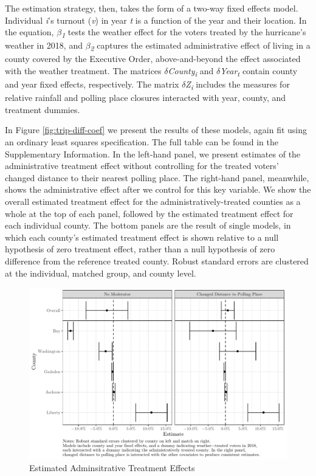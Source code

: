 \documentclass[
  12pt,
]{article}
\begin{document}
The estimation strategy, then, takes the form of a two-way fixed effects model. Individual \emph{i}'s turnout (\emph{v}) in year \emph{t} is a function of the year and their location. In the equation, \emph{\(\beta\)\textsubscript{1}} tests the weather effect for the voters treated by the hurricane's weather in 2018, and \emph{\(\beta\)\textsubscript{2}} captures the estimated administrative effect of living in a county covered by the Executive Order, above-and-beyond the effect associated with the weather treatment. The matrices \emph{\(\delta\)County\textsubscript{i}} and \emph{\(\delta\)Year\textsubscript{t}} contain county and year fixed effects, respectively. The matrix \emph{\(\delta\)Z\textsubscript{i}} includes the measures for relative rainfall and polling place closures interacted with year, county, and treatment dummies.

In Figure \ref{fig:trip-diff-coef} we present the results of these models, again fit using an ordinary least squares specification. The full table can be found in the Supplementary Information. In the left-hand panel, we present estimates of the administrative treatment effect without controlling for the treated voters' changed distance to their nearest polling place. The right-hand panel, meanwhile, shows the administrative effect after we control for this key variable. We show the overall estimated treatment effect for the administratively-treated counties as a whole at the top of each panel, followed by the estimated treatment effect for each individual county. The bottom panels are the result of single models, in which each county's estimated treatment effect is shown relative to a null hypothesis of zero treatment effect, rather than a null hypothesis of zero difference from the reference treated county. Robust standard errors are clustered at the individual, matched group, and county level.

\begin{figure}[h]

{\centering \includegraphics{hurricane_michael_files/figure-latex/tripd-to-chunk-reg-1} 

}

\caption{\label{fig:trip-diff-coef}Estimated Adminsitrative Treatment Effects}\label{fig:tripd-to-chunk-reg}
\end{figure}
\end{document}
